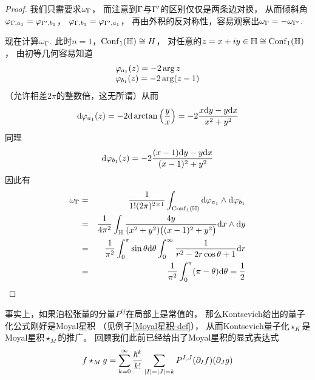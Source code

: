 \begin{proof}
我们只需要求$\omega_{\Gamma}$，
而注意到$\Gamma$与$\Gamma'$的区别仅仅是两条边对换，
从而倾斜角$\varphi_{\Gamma,a_1}=\varphi_{\Gamma',b_1}$，
$\varphi_{\Gamma,b_1}=\varphi_{\Gamma',a_1}$，
再由外积的反对称性，容易观察出$\omega_{\Gamma}=-\omega_{\Gamma'}$.

现在计算$\omega_\Gamma$.
此时$n=1$，$\operatorname{Conf}_1(\mathbb{H})\cong H$，
对任意的$z=x+iy\in\mathbb{H}\cong\operatorname{Conf}_1(\mathbb{H})$，
由初等几何容易知道
$$
  \begin{array}{ll}
    \varphi_{a_1}(z)=-2\arg z\\
    \varphi_{b_1}(z)=-2\arg(z-1)
  \end{array}
$$
（允许相差$2\pi$的整数倍，这无所谓）从而
$$
    \mathrm{d}\varphi_{a_1}(z)=-2\mathrm{d}\arctan\left(\frac{y}{x}\right)
=-2\frac{x\mathrm{d} y-y\mathrm{d} x}{x^2+y^2}
$$
同理
$$\mathrm{d}\varphi_{b_1}(z)=-2\frac{(x-1)\mathrm{d} y-y\mathrm{d} x}{(x-1)^2+y^2}$$
因此有
\begin{eqnarray*}
     \omega_\Gamma
&=&
     \frac{1}{1!(2\pi)^{2\times1}}
     \int_{\operatorname{Conf}_1(\mathbb{H})}
       \mathrm{d}\varphi_{a_1}
       \wedge
       \mathrm{d}\varphi_{b_1}\\
&=&
     \frac{1}{4\pi^2}
     \int_{\mathbb{H}}
       \frac{4y}
            {(x^2+y^2)\big((x-1)^2+y^2\big)}
       \mathrm{d} x\wedge\mathrm{d} y\\
&=&
     \frac{1}{\pi^2}
     \int_{0}^{\pi}
       \sin\theta
       \mathrm{d}\theta
     \int_0^{\infty}
       \frac{1}
            {r^2-2r\cos\theta+1}
       \mathrm{d} r\\
&=&
     \frac{1}{\pi^2}
     \int_{0}^{\pi}
       (\pi-\theta)
       \mathrm{d}\theta
=
     \frac{1}{2}
\end{eqnarray*}
\end{proof}

\begin{rem}
事实上，如果泊松张量的分量$P^{ij}$在局部上是常值的，
那么Kontsevich给出的量子化公式刚好是Moyal星积
（见例子\ref{Moyal星积-def}），
从而Kontsevich量子化$\star_K$是Moyal星积$\star_M$的推广。
回顾我们此前已经给出了Moyal星积的显式表达式
$$f\star_M g=\sum_{k=0}^{\infty}\frac{\hbar^k}{k!}
\sum_{|I|=|J|=k}P^{I,J}(\partial_If)(\partial_Jg)$$
\end{rem}


